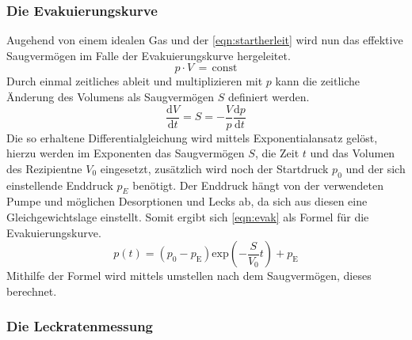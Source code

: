 \subsubsection{Die Evakuierungskurve}
Augehend von einem idealen Gas und der \autoref{eqn:startherleit} wird nun das effektive Saugvermögen im Falle der Evakuierungskurve hergeleitet.
\begin{equation}
    p\cdot V\,=\, \text{const}
    \label{eqn:startherleit}
\end{equation}
Durch einmal zeitliches ableit und multiplizieren mit $p$ kann die zeitliche Änderung des Volumens als Saugvermögen $S$ definiert werden.
\begin{equation}
\frac{\text{d}V}{\text{d}t} = S = - \frac{V}{p} \frac{\text{d}p}{\text{d}t}
\end{equation}
Die so erhaltene Differentialgleichung wird mittels Exponentialansatz gelöst, hierzu werden im Exponenten das Saugvermögen $S$, die Zeit $t$ und das 
Volumen des Rezipientne $V_0$ eingesetzt, zusätzlich wird noch der Startdruck $p_0$ und der sich einstellende Enddruck $p_E$ benötigt. Der Enddruck 
hängt von der verwendeten Pumpe und möglichen Desorptionen und Lecks ab, da sich aus diesen eine Gleichgewichtslage einstellt. 
Somit ergibt sich \autoref{eqn:evak} als Formel für die Evakuierungskurve.
\begin{equation}
    p(t) = (p_0 - p_\text{E}) \text{exp}\left( - \frac{S}{V_0}t \right) + p_\text{E}
    \label{eqn:evak}
\end{equation}
Mithilfe der Formel wird mittels umstellen nach dem Saugvermögen, dieses berechnet.
\subsubsection{Die Leckratenmessung}

